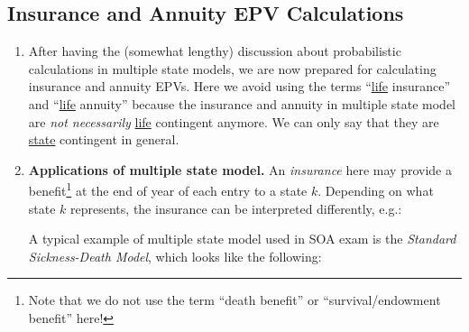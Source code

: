\subsection{Insurance and Annuity EPV Calculations}
\label{subsect:mult-state-insur-ann-epv}
\begin{enumerate}
\item After having the (somewhat lengthy) discussion about probabilistic
calculations in multiple state models, we are now prepared for calculating
insurance and annuity EPVs. Here we avoid using the terms ``\underline{life}
insurance'' and ``\underline{life} annuity'' because the insurance and annuity
in multiple state model are \emph{not necessarily} \underline{life} contingent
anymore. We can only say that they are \underline{state} contingent in general.

\item \textbf{Applications of multiple state model.} An
\emph{insurance} here may provide a benefit\footnote{Note that we do not use
the term ``death benefit'' or ``survival/endowment benefit'' here!} at the end
of year of each entry to a state \(k\). Depending on what state \(k\)
represents, the insurance can be interpreted differently, e.g.:
A typical example of multiple state model used in SOA exam is the
\emph{Standard Sickness-Death Model}, which looks like the following:
\begin{center}
\end{center}


\end{enumerate}
